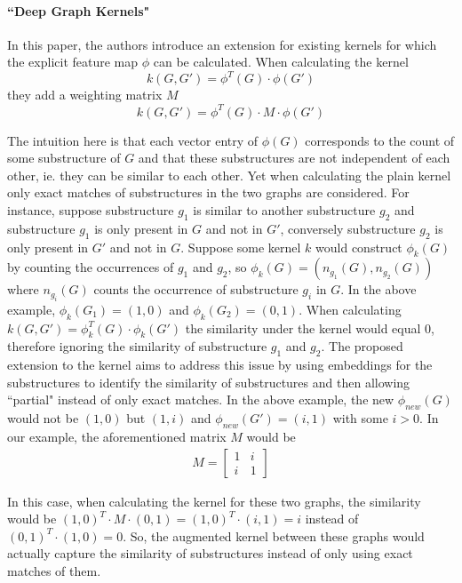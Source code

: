\paragraph{``Deep Graph Kernels" \cite{Yanardag2015}}
In this paper, the authors introduce an extension for existing kernels for which the explicit feature map $\phi$ can be calculated.
When calculating the kernel
\begin{equation*}
k(G, G') = \phi^T(G) \cdot \phi(G')
\end{equation*}
they add a weighting matrix $M$
\begin{equation*}
k(G, G') = \phi^T(G) \cdot M \cdot \phi(G')
\end{equation*}

The intuition here is that each vector entry of $\phi(G)$ corresponds to the count of some substructure of $G$ and that these substructures are not independent of each other, ie. they can be similar to each other.
Yet when calculating the plain kernel only exact matches of substructures in the two graphs are considered.
For instance, suppose substructure $g_1$ is similar to another substructure $g_2$ and substructure $g_1$ is only present in $G$ and not in $G'$, conversely substructure $g_2$ is only present in $G'$ and not in $G$.
Suppose some kernel $k$ would construct $\phi_k(G)$ by counting the occurrences of $g_1$ and $g_2$, so $\phi_k(G) = (n_{g_1}(G), n_{g_2}(G))$ where $n_{g_i}(G)$ counts the occurrence of substructure $g_i$ in $G$.
In the above example, $\phi_k(G_1) = (1, 0)$ and $\phi_k(G_2) = (0, 1)$. When calculating $k(G, G') = \phi_k^T(G) \cdot \phi_k(G') $ the similarity under the kernel would equal 0, therefore ignoring the similarity of substructure $g_1$ and $g_2$.
The proposed extension to the kernel aims to address this issue by using embeddings for the substructures to identify the similarity of substructures and then allowing ``partial" instead of only exact matches.
In the above example, the new $\phi_{new}(G)$ would not be $(1, 0)$ but $(1, i)$ and $\phi_{new}(G') = (i, 1)$ with some $i > 0$.
In our example, the aforementioned matrix $M$ would be
\begin{align*}
M = \begin{bmatrix}
1 & i \\
i & 1
\end{bmatrix}
\end{align*}

In this case, when calculating the kernel for these two graphs, the similarity would be $(1, 0)^T \cdot M \cdot (0, 1) = (1, 0)^T \cdot (i, 1) = i$ instead of $(0, 1)^T \cdot (1, 0) = 0$.
So, the augmented kernel between these graphs would actually capture the similarity of substructures instead of only using exact matches of them.

